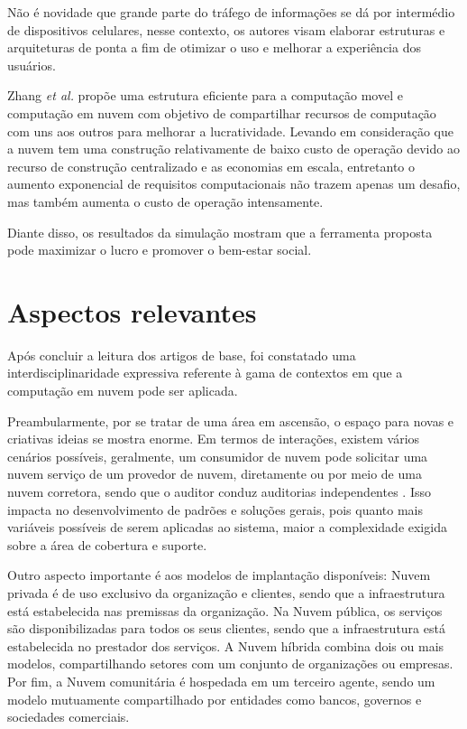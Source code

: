 \documentclass[12pt]{article}
\begin{document}
Não é novidade que grande parte do tráfego de informações se dá por intermédio de dispositivos celulares, nesse contexto, os autores visam elaborar estruturas e arquiteturas de ponta a fim de otimizar o uso e melhorar a experiência dos usuários.

Zhang \emph{et al.} propõe uma estrutura eficiente para a computação movel e computação em nuvem com objetivo de compartilhar recursos de computação com uns aos outros para melhorar a lucratividade. Levando em consideração que a nuvem tem uma construção relativamente de baixo custo de operação devido ao recurso de construção centralizado e as economias em escala, entretanto o aumento exponencial de requisitos computacionais não trazem apenas um desafio, mas também aumenta o custo de operação intensamente.

Diante disso, os resultados da simulação mostram que a ferramenta proposta pode maximizar o lucro e promover o bem-estar social.

\section{Aspectos relevantes}
Após concluir a leitura dos artigos de base, foi constatado uma interdisciplinaridade expressiva referente à gama de contextos em que a computação em nuvem pode ser aplicada.

Preambularmente, por se tratar de uma área em ascensão, o espaço para novas e criativas ideias se mostra enorme. Em termos de interações, existem vários cenários possíveis, geralmente, um consumidor de nuvem pode solicitar uma nuvem serviço de um provedor de nuvem, diretamente ou por meio de uma nuvem corretora, sendo que o auditor conduz auditorias independentes \cite{donno}. Isso impacta no desenvolvimento de padrões e soluções gerais, pois quanto mais variáveis possíveis de serem aplicadas ao sistema, maior a complexidade exigida sobre a área de cobertura e suporte.

Outro aspecto importante é aos modelos de implantação disponíveis: Nuvem privada é de uso exclusivo da organização e clientes, sendo que a infraestrutura está estabelecida nas premissas da organização. Na Nuvem pública, os serviços são disponibilizadas para todos os seus clientes, sendo que a infraestrutura está estabelecida no prestador dos serviços. A Nuvem híbrida combina dois ou mais modelos, compartilhando setores com um conjunto de organizações ou empresas. Por fim, a Nuvem comunitária é hospedada em um terceiro agente, sendo um modelo mutuamente compartilhado por entidades como bancos, governos e sociedades comerciais. 
\end{document}
